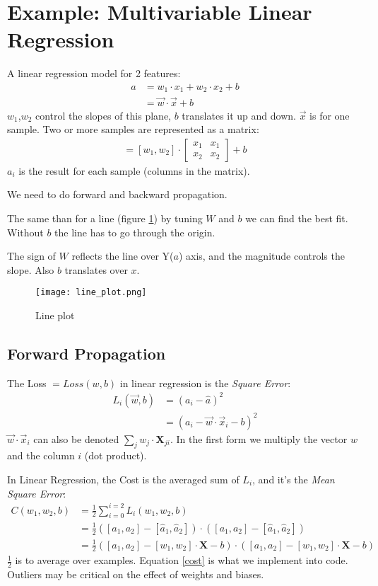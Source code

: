 \section{Example: Multivariable Linear Regression}
A linear regression model for 2 features:
\begin{align*}
 a &= w_1\cdot x_1 + w_2\cdot x_2 + b \\
   &= \vec{w}\cdot\vec{x} + b
\end{align*}
$w_1$,$w_2$ control the slopes of this plane, $b$ translates it up and down. $\vec{x}$ is for one sample. Two or more samples are represented as a matrix:
\begin{align*}
[a_1, a_2] = 
  [w_1, w_2]\cdot{}
  \begin{bmatrix}
  x_1 & x_1\\
  x_2 & x_2 
  \end{bmatrix}
 +  b
\end{align*}
$a_i$ is the result for each sample (columns in the matrix).

We need to do forward and backward propagation.

The same than for a line (figure \ref{fig:line}) by tuning $W$ and $b$  we can find the best fit. Without $b$ the line has to go through the origin. 

The sign of $W$ reflects the line over Y($a$) axis, and the magnitude controls the slope. Also $b$ translates over $x$.

\begin{figure}[h]
 \centering
 \texttt{[image: line\_plot.png]}
  \caption{Line plot} \label{fig:line}
\end{figure}


\subsection{Forward Propagation}
The Loss $= Loss(w,b)$ in linear regression is the \textit{Square Error}:
\begin{align*}
  L_i(\vec{w}, b) &= (a_i - \hat{a})^2\\
  &=(a_i -\vec{w}\cdot{}\vec{x}_{i} -b)^2
\end{align*}
$\vec{w}\cdot{}\vec{x}_i$ can also be denoted $\sum_jw_j\cdot{}\mathbf{X}_{ji}$. In the first form we multiply the vector $w$ and the column $i$ (dot product).

In Linear Regression, the Cost is the averaged sum of $L_i$, and it's the \textit{Mean Square Error}:
\begin{align}
  C(w_1, w_2, b) &= \frac{1}{2} \sum_{i=0}^{i=2} L_i(w_1, w_2, b)\\
  &= \frac{1}{2}([a_1, a_2] - [\hat{a}_1, \hat{a}_2])\cdot{}([a_1, a_2]-[\hat{a}_1, \hat{a}_2])\\
  &=\frac{1}{2}([a_1, a_2] - [w_1, w_2]\cdot{}\mathbf{X}-b)\cdot{}([a_1, a_2] - [w_1,w_2]\cdot{}\mathbf{X} -b) \label{cost}
\end{align}
$\frac{1}{2}$ is to average over examples. Equation \ref{cost} is what we implement into code.
Outliers may be critical on the effect of weights and biases.

